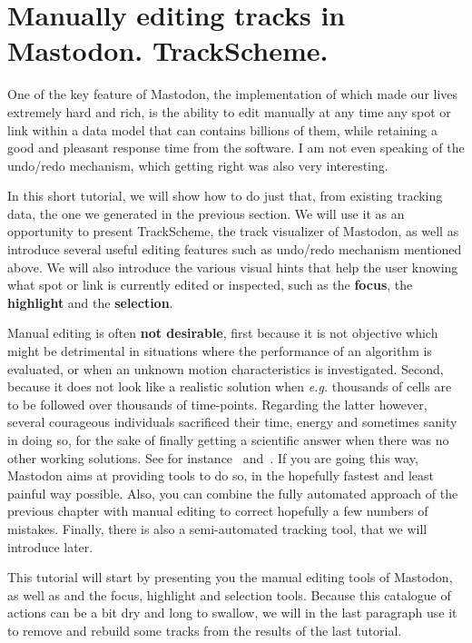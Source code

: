 \section{Manually editing tracks in Mastodon. TrackScheme.}

One of the key feature of Mastodon, the implementation of which made our lives extremely hard and rich, is the ability to edit manually at any time any spot or link within a data model that can contains billions of them, while retaining a good and pleasant response time from the software.
I am not even speaking of the undo/redo mechanism, which getting right was also very interesting. 

In this short tutorial, we will show how to do just that, from existing tracking data, the one we generated in the previous section. 
We will use it as an opportunity to present TrackScheme, the track visualizer of Mastodon, as well as introduce several useful editing features such as undo/redo mechanism mentioned above.
We will also introduce the various visual hints that help the user knowing what spot or link is currently edited or inspected, such as the \textbf{focus}, the \textbf{highlight} and the \textbf{selection}.

Manual editing is often \textbf{not desirable}, first because it is not objective which might be detrimental in situations where the performance of an algorithm is evaluated, or when an unknown motion characteristics is investigated. 
Second, because it does not look like a realistic solution when \textit{e.g.} thousands of cells are to be followed over thousands of time-points.
Regarding the latter however, several courageous individuals sacrificed their time, energy and sometimes sanity in doing so, for the sake of finally getting a scientific answer when there was no other working solutions. 
See for instance~\cite{MaMuT} and~\cite{McDole2018}.
If you are going this way, Mastodon aims at providing tools to do so, in the hopefully fastest and least painful way possible. 
Also, you can combine the fully automated approach of the previous chapter with manual editing to correct hopefully a few numbers of mistakes.
Finally, there is also a semi-automated tracking tool, that we will introduce later.

This tutorial will start by presenting you the manual editing tools of Mastodon, as well as \TrackScheme and the focus, highlight and selection tools.
Because this catalogue of actions can be a bit dry and long to swallow, we will in the last paragraph use it to remove and rebuild some tracks from the results of the last tutorial.



